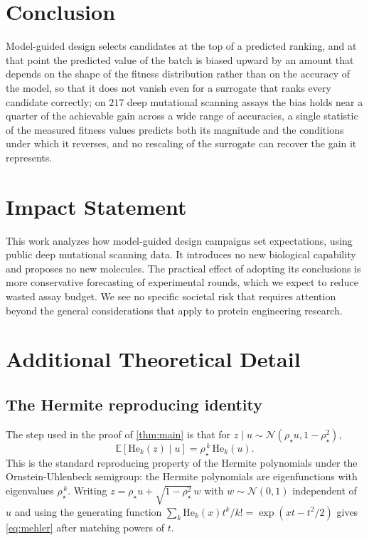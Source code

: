 \documentclass{article}
\theoremstyle{plain}
\theoremstyle{definition}
\newcommand{\Exp}{\mathbb{E}}
\newcommand{\He}{\mathrm{He}}
\newcommand{\Normal}{\mathcal{N}}
\begin{document}
\section{Conclusion}
\label{sec:conclusion}

Model-guided design selects candidates at the top of a predicted ranking, and at that
point the predicted value of the batch is biased upward by an amount that depends on
the shape of the fitness distribution rather than on the accuracy of the model, so that
it does not vanish even for a surrogate that ranks every candidate correctly; on $217$
deep mutational scanning assays the bias holds near a quarter of the achievable gain
across a wide range of accuracies, a single statistic of the measured fitness values
predicts both its magnitude and the conditions under which it reverses, and no
rescaling of the surrogate can recover the gain it represents.
\section*{Impact Statement}

This work analyzes how model-guided design campaigns set expectations, using public
deep mutational scanning data. It introduces no new biological capability and proposes
no new molecules. The practical effect of adopting its conclusions is more conservative
forecasting of experimental rounds, which we expect to reduce wasted assay budget. We
see no specific societal risk that requires attention beyond the general considerations
that apply to protein engineering research.




\newpage
\appendix
\onecolumn

\section{Additional Theoretical Detail}
\label{app:theory}

\subsection{The Hermite reproducing identity}
\label{app:mehler}

The step used in the proof of \cref{thm:main} is that for $z \mid u \sim
\Normal(\rho_\star u, 1-\rho_\star^2)$,
\begin{equation}
\Exp\!\left[\He_k(z) \mid u\right] = \rho_\star^{\,k}\,\He_k(u).
\label{eq:mehler}
\end{equation}
This is the standard reproducing property of the Hermite polynomials under the
Ornstein-Uhlenbeck semigroup: the Hermite polynomials are eigenfunctions with
eigenvalues $\rho_\star^{\,k}$. Writing $z = \rho_\star u + \sqrt{1-\rho_\star^2}\,w$
with $w \sim \Normal(0,1)$ independent of $u$ and using the generating function
$\sum_k \He_k(x) t^k / k! = \exp(xt - t^2/2)$ gives \cref{eq:mehler} after matching
powers of $t$.
\end{document}
